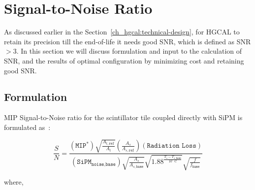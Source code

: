 \clearpage
\section{
  Signal-to-Noise Ratio
 }

As discussed earlier in the Section~\ref{ch_hgcal:technical-design},
for \gls{HGCAL} to retain its precision till the end-of-life it needs
good \gls{SNR}, which is defined as \gls{SNR} \( > 3\). In this section we
will discuss formulation and input to the calculation of \gls{SNR}, and
the results of optimal configuration by minimizing cost and
retaining good \gls{SNR}.

\subsection{
  Formulation
}

\gls{MIP} Signal-to-Noise ratio for the scintillator tile coupled directly
with SiPM is formulated as~\cite{cms-dn-17-001}:

\begin{equation}
  \frac{S}{N} =
  \frac{
  (\texttt{MIP}^{*})
  \sqrt{\frac{A_{t,\texttt{ref}}}{A_{t}}}
  \left(\frac{A_{s}}{A_{s,\texttt{ref}}}\right)
  (\texttt{Radiation Loss})
  }
  {
  (\texttt{SiPM}_\texttt{noise,base})
  \sqrt{\frac{A_{s}}{A_{s,\texttt{base}}}}
  \sqrt{1.88^{\frac{T_{s}-T_{s,\texttt{base}}}{10^{\circ} \text{ C}}}}
  \sqrt{\frac{f}{f_{\texttt{base}}}}
  }
\end{equation}

where,

